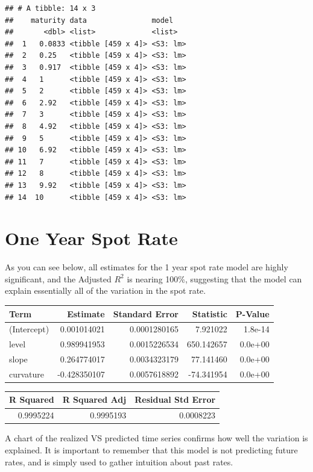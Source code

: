 \documentclass[]{book}
\theoremstyle{definition}
\theoremstyle{definition}
\theoremstyle{definition}
\theoremstyle{remark}
\begin{document}
\begin{verbatim}
## # A tibble: 14 x 3
##    maturity data               model   
##       <dbl> <list>             <list>  
##  1   0.0833 <tibble [459 x 4]> <S3: lm>
##  2   0.25   <tibble [459 x 4]> <S3: lm>
##  3   0.917  <tibble [459 x 4]> <S3: lm>
##  4   1      <tibble [459 x 4]> <S3: lm>
##  5   2      <tibble [459 x 4]> <S3: lm>
##  6   2.92   <tibble [459 x 4]> <S3: lm>
##  7   3      <tibble [459 x 4]> <S3: lm>
##  8   4.92   <tibble [459 x 4]> <S3: lm>
##  9   5      <tibble [459 x 4]> <S3: lm>
## 10   6.92   <tibble [459 x 4]> <S3: lm>
## 11   7      <tibble [459 x 4]> <S3: lm>
## 12   8      <tibble [459 x 4]> <S3: lm>
## 13   9.92   <tibble [459 x 4]> <S3: lm>
## 14  10      <tibble [459 x 4]> <S3: lm>
\end{verbatim}

\hypertarget{one-year-spot-rate}{%
\section{One Year Spot Rate}\label{one-year-spot-rate}}

As you can see below, all estimates for the 1 year spot rate model are
highly significant, and the Adjusted \(R^2\) is nearing 100\%,
suggesting that the model can explain essentially all of the variation
in the spot rate.

\begin{tabular}{l|r|r|r|r}
\hline
Term & Estimate & Standard Error & Statistic & P-Value\\
\hline
(Intercept) & 0.001014021 & 0.0001280165 & 7.921022 & 1.8e-14\\
\hline
level & 0.989941953 & 0.0015226534 & 650.142657 & 0.0e+00\\
\hline
slope & 0.264774017 & 0.0034323179 & 77.141460 & 0.0e+00\\
\hline
curvature & -0.428350107 & 0.0057618892 & -74.341954 & 0.0e+00\\
\hline
\end{tabular}

\begin{tabular}{r|r|r}
\hline
R Squared & R Squared Adj & Residual Std Error\\
\hline
0.9995224 & 0.9995193 & 0.0008223\\
\hline
\end{tabular}

A chart of the realized VS predicted time series confirms how well the
variation is explained. It is important to remember that this model is
not predicting future rates, and is simply used to gather intuition
about past rates.
\end{document}
